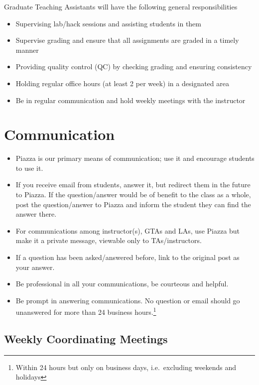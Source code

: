 \documentclass[12pt]{scrartcl}
\begin{document}
Graduate Teaching Assistants will have the following general responsibilities
\begin{itemize}
  \item Supervising lab/hack sessions and assisting students in them
  \item Supervise grading and ensure that all assignments are graded 
    in a timely manner
  \item Providing quality control (QC) by checking grading and ensuring consistency
  \item Holding regular office hours (at least 2 per week) in a designated area
  \item Be in regular communication and hold weekly meetings with the instructor
\end{itemize}


\section*{Communication}

\begin{itemize}
  \item Piazza is our primary means of communication; use it and encourage 
students to use it.  
  \item If you receive email from students, answer it, 
but redirect them in the future to Piazza.  If the question/answer
would be of benefit to the class as a whole, post the question/answer
to Piazza and inform the student they can find the answer there.
  \item For communications among instructor(s), GTAs and LAs, use Piazza but
make it a private message, viewable only to TAs/instructors.
  \item If a question has been asked/answered before, link to the original
  post as your answer.  
  \item Be professional in all your communications, be courteous and
  helpful.  
  \item Be prompt in answering communications.  No question or email should go 
  unanswered for more than 24 business hours.\footnote{Within 24 hours but only
  on business days, i.e.\ excluding weekends and holidays}
\end{itemize}

\subsection*{Weekly Coordinating Meetings}
\end{document}
